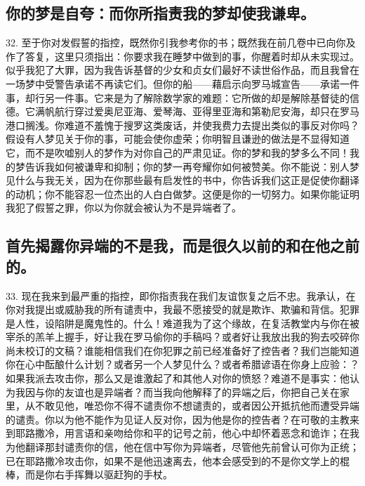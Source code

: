 
\subsection{你的梦是自夸：而你所指责我的梦却使我谦卑。}

32. 至于你对发假誓的指控，既然你引我参考你的书；既然我在前几卷中已向你及作了答复，这里只须指出：你要求我在睡梦中做到的事，你醒着时却从未实现过。似乎我犯了大罪，因为我告诉基督的少女和贞女们最好不读世俗作品，而且我曾在一场梦中受警告承诺不再读它们。但你的船——藉启示向罗马城宣告——承诺一件事，却行另一件事。它来是为了解除数学家的难题：它所做的却是解除基督徒的信德。它满帆航行穿过爱奥尼亚海、爱琴海、亚得里亚海和第勒尼安海，却只在罗马港口搁浅。你难道不羞愧于搜罗这类废话，并使我费力去提出类似的事反对你吗？假设有人梦见关于你的事，可能会使你虚荣；你明智且谦逊的做法是不显得知道它，而不是吹嘘别人的梦作为对你自己的严肃见证。你的梦和我的梦多么不同！我的梦告诉我如何被谦卑和抑制；你的梦一再夸耀你如何被赞美。你不能说：别人梦见什么与我无关，因为在你那些最有启发性的书中，你告诉我们这正是促使你翻译的动机；你不能容忍一位杰出的人白白做梦。这便是你的一切努力。如果你能证明我犯了假誓之罪，你以为你就会被认为不是异端者了。\par


\subsection{首先揭露你异端的不是我，而是很久以前的和在他之前的。}

33. 现在我来到最严重的指控，即你指责我在我们友谊恢复之后不忠。我承认，在你对我提出或威胁我的所有谴责中，我最不愿接受的就是欺诈、欺骗和背信。犯罪是人性，设陷阱是魔鬼性的。什么！难道我为了这个缘故，在复活教堂内与你在被宰杀的羔羊上握手，好让我在罗马偷你的手稿吗？或者好让我放出我的狗去咬碎你尚未校订的文稿？谁能相信我们在你犯罪之前已经准备好了控告者？我们岂能知道你在心中酝酿什么计划？或者另一个人梦见什么？或者希腊谚语在你身上应验：？如果我派去攻击你，那么又是谁激起了和其他人对你的愤怒？难道不是事实：他认为我因与你的友谊也是异端者？而当我向他解释了的异端之后，你把自己关在家里，从不敢见他，唯恐你不得不谴责你不想谴责的，或者因公开抵抗他而遭受异端的谴责。你以为他不能作为见证人反对你，因为他是你的控告者？在可敬的主教来到耶路撒冷，用言语和亲吻给你和平的记号之前，他心中却怀着恶念和诡诈；在我为他翻译那封谴责你的信，他在信中写你为异端者，尽管他先前曾认可你为正统；已在耶路撒冷攻击你，如果不是他迅速离去，他本会感受到的不是你文学上的棍棒，而是你右手挥舞以驱赶狗的手杖。\par


